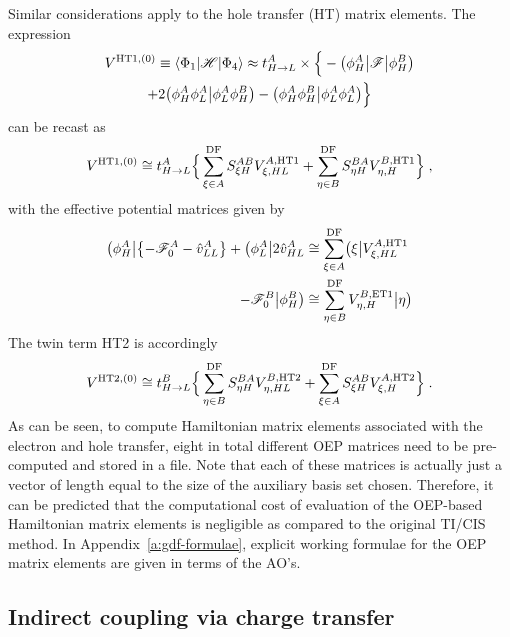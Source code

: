 Similar considerations apply to the hole transfer (HT) matrix elements.
The expression
%
\begin{multline}\label{e:v0-ht1}
 V^{{\rm HT1},(0)} \equiv \left< \Phi_1 \vert \mathscr{H} \vert \Phi_4 \right> \approx 
 t_{H\rightarrow L}^A \times \Big\{ 
-\big(\phi_H^A \big| \mathscr{F} \big| \phi_H^B \big) \\
   + 2 \big( \phi_H^A \phi_L^A \big| \phi_L^A \phi_H^B \big) - \big( \phi_H^A \phi_H^B \big| \phi_L^A \phi_L^A \big) 
 \Big\} 
\end{multline}
%
can be recast as
%
\begin{multline}\label{e:v0-ht1-oep}
 V^{{\rm HT1},(0)} \cong t_{H\rightarrow L}^A \Big\{ 
 \sum_{\xi\in A}^{\rm DF} S_{\xi H}^{AB} V^{A,{\rm HT1}}_{\xi,HL} +
 \sum_{\eta\in B}^{\rm DF} S_{\eta H}^{BA} V^{B,{\rm HT1}}_{\eta,H}
 \Big\} \;,
\end{multline}
%
with the effective potential matrices given by
%
%
\begin{subequations}
\begin{align}
 \bigl( {\phi_H^A} \bigl\lvert \left\{ -\mathscr{F}_0^A - \hat{v}^A_{LL} \right\}
 + \bigl( {\phi_L^A} \bigl\lvert 2 \hat{v}^A_{HL} 
 &\cong \sum_{\xi\in A}^{\rm DF} \bigl( {\xi} \bigl\lvert V^{A,{\rm HT1}}_{\xi,HL} \\
 -\mathscr{F}_0^B \bigr\rvert {\phi_H^B} \bigr) &\cong \sum_{\eta\in B}^{\rm DF} V^{B,{\rm ET1}}_{\eta,H} \bigr\rvert {\eta} \bigr) 
\end{align}
\end{subequations}
%
The twin term HT2 is accordingly
%
\begin{multline}\label{e:v0-ht2-oep}
 V^{{\rm HT2},(0)} \cong t_{H\rightarrow L}^B \Big\{ 
 \sum_{\eta\in B}^{\rm DF} S_{\eta H}^{BA} V^{B,{\rm HT2}}_{\eta,HL} +
 \sum_{\xi\in A}^{\rm DF} S_{\xi H}^{AB} V^{A,{\rm HT2}}_{\xi,H}
 \Big\} \;.
\end{multline}
%
As can be seen, to compute Hamiltonian matrix elements
associated with the electron and hole transfer, eight in total
different OEP matrices need to be pre\hyp{}computed and stored in a file.
Note that each of these matrices is actually just a vector of length
equal to the size of the auxiliary basis set chosen. Therefore,
it can be predicted that the computational cost of evaluation of the OEP\hyp{}based Hamiltonian
matrix elements is negligible as compared to the original TI/CIS method.
In Appendix~\ref{a:gdf-formulae}, explicit working formulae
for the OEP matrix elements are given in terms of the AO's.

\subsection{\label{s:2.2}Indirect coupling via charge transfer}

